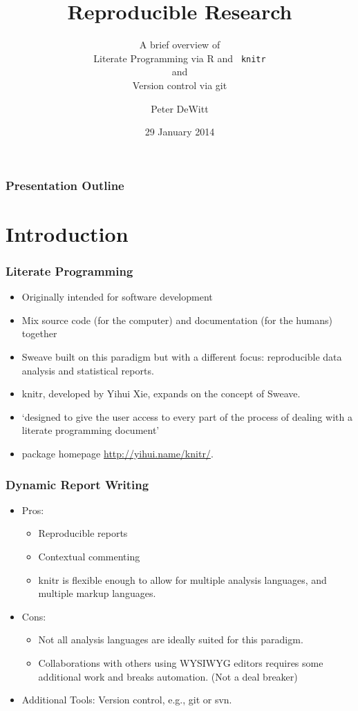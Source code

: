 \documentclass[t]{beamer}\usepackage[]{graphicx}\usepackage[]{color}
\title[Reproducible Research]{Reproducible Research}
\subtitle{A brief overview of\\Literate Programming via R and {\tt
knitr}\\and\\Version control via git}
\author{Peter DeWitt}
\institute{University of Colorado Anschutz Medical Campus 
 
Department of Biostatistics}
\date{29 January 2014}
\begin{document}
\begin{frame}[fragile]
  \titlepage
\end{frame}

\section[Outline]{} 
\begin{frame}
  \frametitle{Presentation Outline}
  \tableofcontents
\end{frame}

\section{Introduction}
\begin{frame}[fragile] 
  \frametitle{Literate Programming}
  \begin{itemize}
    \item Originally intended for software development
    \item Mix source code (for the computer) and documentation (for the humans)
      together
    \item Sweave built on this paradigm but with a different focus:
      reproducible data analysis and statistical reports.
    \item knitr, developed by Yihui Xie, expands on the concept of Sweave.
    \item `designed to give the user access to every part of the process of
      dealing with a literate programming document'
    \item package homepage \url{http://yihui.name/knitr/}.
  \end{itemize}
\end{frame}

\begin{frame} 
  \frametitle{Dynamic Report Writing}
  \begin{itemize}
    \item Pros: 
      \begin{itemize}
        \item Reproducible reports 
        \item Contextual commenting 
        \item knitr is flexible enough to allow for multiple analysis languages,
          and multiple markup languages.
      \end{itemize}
    \item Cons:
      \begin{itemize}
        \item Not all analysis languages are ideally suited for this paradigm.
        \item Collaborations with others using WYSIWYG editors requires some
          additional work and breaks automation. (Not a deal breaker)
      \end{itemize}
    \item Additional Tools: Version control, e.g., git or svn.
  \end{itemize}
\end{frame}
\end{document}

